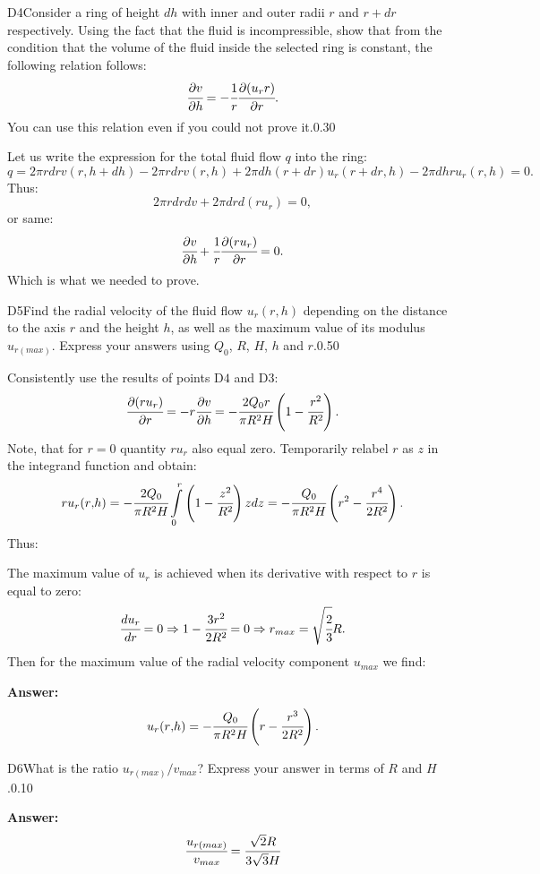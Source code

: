 \documentclass[11pt,a4paper]{article}
\begin{document}
\begin{solcard}{D4}{Consider a ring of height $dh$ with inner and outer radii $r$ and $r+dr$ respectively. Using the fact that the fluid is incompressible, show that from the condition that the volume of the fluid inside the selected ring is constant, the following relation follows: $$\cfrac{\partial v}{\partial h}=-\cfrac{1}{r}\cfrac{\partial (u_rr)}{\partial r}{.}$$You can use this relation even if you could not prove it.}{0.30}

Let us write the expression for the total fluid flow $q$ into the ring: $$q=2\pi rdrv(r{,}h+dh)-2\pi rdrv(r{,}h)+2\pi dh(r+dr)u_r(r+dr{,}h)-2\pi dh ru_r(r{,}h)=0{.} $$Thus: $$2\pi rdrdv+2\pi drd(ru_r)=0{,} $$or same: $$\cfrac{\partial v}{\partial h}+\cfrac{1}{r}\cfrac{\partial (ru_r)}{\partial r}=0{.} $$Which is what we needed to prove.

\end{solcard}

\begin{solcard}{D5}{Find the radial velocity of the fluid flow $u_r(r,h)$ depending on the distance to the axis $r$ and the height $h$, as well as the maximum value of its modulus $u_{r(max)}$. Express your answers using $Q_0$, $R$, $H$, $h$ and $r$.}{0.50}

Consistently use the results of points $\mathrm{D4}$ and $\mathrm{D3}$: $$\cfrac{\partial (ru_r)}{\partial r}=-r\cfrac{\partial v}{\partial h}=-\cfrac{2Q_0r}{\pi R^2H}\left(1-\cfrac{r^2}{R^2}\right){.} $$Note, that for $r=0$ quantity $ru_r$ also equal zero. Temporarily relabel $r$ as $z$ in the integrand function and obtain: $$ru_r(r{,}h)=-\cfrac{2Q_0}{\pi R^2H}\int\limits_{0}^r\left(1-\cfrac{z^2}{R^2}\right)zdz=-\cfrac{Q_0}{\pi R^2H}\left(r^2-\cfrac{r^4}{2R^2}\right){.} $$Thus:


The maximum value of $u_r$ is achieved when its derivative with respect to $r$ is equal to zero: $$\cfrac{du_r}{dr}=0\Rightarrow 1-\cfrac{3r^2}{2R^2}=0\Rightarrow r_{max}=\sqrt{\cfrac{2}{3}}R{.} $$Then for the maximum value of the radial velocity component $u_{max}$ we find:

\par\smallskip\noindent\textbf{Answer:} $$u_r(r{,}h)=-\cfrac{Q_0}{\pi R^2H}\left(r-\cfrac{r^3}{2R^2}\right){.} $$
\end{solcard}

\begin{solcard}{D6}{What is the ratio $u_{r(max)}/v_{max}$? Express your answer in terms of $R$ and $H$.}{0.10}
\par\smallskip\noindent\textbf{Answer:} $$\cfrac{u_{r(max)}}{v_{max}}=\cfrac{\sqrt{2}R}{3\sqrt{3}H} $$
\end{solcard}
\end{document}
